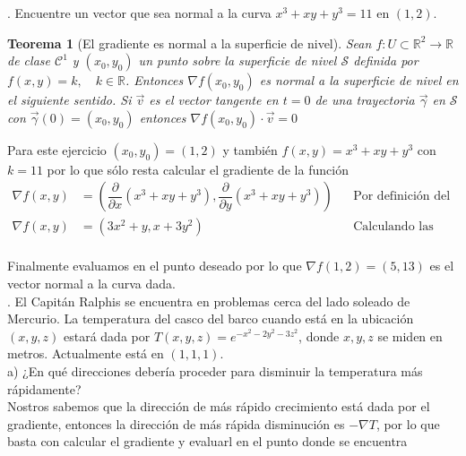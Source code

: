 \documentclass[letterpaper]{article}
\renewcommand{\d}{\partial}
\newcommand{\R}{\mathds{R}}
\renewcommand{\*}{\cdot}
\newtheorem{theorem}{Teorema}[]
\theoremstyle{definition}
\begin{document}
. Encuentre un vector que sea normal a la curva $x^3 + xy + y^3 = 11$ en  $(1,2)$.\\

\begin{theorem}[El gradiente es  normal a la superficie de nivel]
	Sean $ f: U \subset \R^2 \to \R $ de clase $ \mathscr{C}^1 $ y $ (x_0, y_0) $ un punto sobre la superficie de nivel $\mathcal{S}  $ definida por $ f(x,y) = k, \quad k \in \R $. Entonces $ \nabla f(x_0, y_0) $ es normal a la superficie de nivel en el siguiente sentido. Si $ \vec{v} $ es el vector tangente en $ t = 0 $ de una trayectoria $ \vec{\gamma} $ en $ \mathcal{S} $ con $ \vec{\gamma}(0) = (x_0,y_0) $ entonces $ \nabla f(x_0,y_0) \* \vec{v} = 0 $
\end{theorem}

Para este ejercicio $ (x_0,y_0) = (1,2) $ y también $ f(x,y) = x^3+xy+y^3 $ con $ k = 11 $ por lo que sólo resta calcular el gradiente de la función 
\begin{align*}
	\nabla f(x,y) &= \left(\dfrac{\d}{\d x} (x^3+xy+y^3) , \dfrac{\d}{\d y} (x^3+xy+y^3)\right) && \text{Por definición del gradiente}\\
	\nabla f(x,y) &= \left(3x^2 + y , x+3y^2 \right) && \text{Calculando las parciales}\\
\end{align*}

Finalmente evaluamos en el punto deseado por lo que $ \nabla f(1,2) = (5,13) $ es el vector normal a la curva dada.\\

.  El Capitán Ralphis se encuentra en problemas cerca del lado soleado de Mercurio. La temperatura del casco del barco cuando está en la ubicación $(x, y, z)$ estará dada por $T(x,y,z) = e^{-x^2 - 2y^2 - 3z^2}$, donde $x,y,z$ se miden en metros. Actualmente está en $(1,1,1)$.\\

a) ¿En qué direcciones debería proceder para disminuir la temperatura más rápidamente?\\

Nostros sabemos que la dirección de más rápido crecimiento está dada por el gradiente, entonces la dirección de más rápida disminución es $ - \nabla T $, por lo que basta con calcular el gradiente y evaluarl en el punto donde se encuentra
\end{document}
